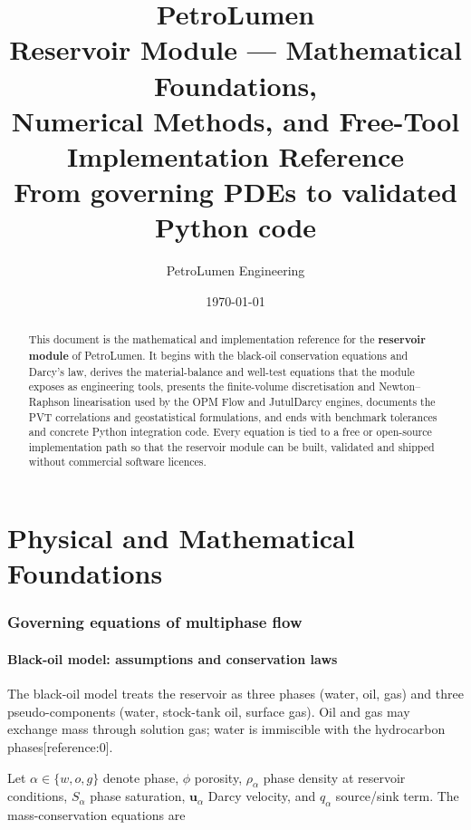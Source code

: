 \documentclass[10pt,a4paper]{article}
\title{
  \vspace{-1.2cm}
  \textbf{PetroLumen}\\[0.2em]
  \large Reservoir Module --- Mathematical Foundations,\\
  Numerical Methods, and Free-Tool Implementation Reference\\[0.4em]
  \normalsize From governing PDEs to validated Python code
}
\author{PetroLumen Engineering}
\date{\today}
\begin{document}
\maketitle
\thispagestyle{empty}

\begin{abstract}
\noindent
This document is the mathematical and implementation reference for the
\textbf{reservoir module} of PetroLumen. It begins with the black-oil
conservation equations and Darcy's law, derives the material-balance and
well-test equations that the module exposes as engineering tools, presents the
finite-volume discretisation and Newton--Raphson linearisation used by the
OPM Flow and JutulDarcy engines, documents the PVT correlations and
geostatistical formulations, and ends with benchmark tolerances and concrete
Python integration code. Every equation is tied to a free or open-source
implementation path so that the reservoir module can be built, validated and
shipped without commercial software licences.
\end{abstract}

\tableofcontents
\clearpage

\part{Physical and Mathematical Foundations}

\section{Governing equations of multiphase flow}

\subsection{Black-oil model: assumptions and conservation laws}

The black-oil model treats the reservoir as three phases (water, oil, gas) and
three pseudo-components (water, stock-tank oil, surface gas). Oil and gas may
exchange mass through solution gas; water is immiscible with the hydrocarbon
phases[reference:0].

Let $\alpha\in\{w,o,g\}$ denote phase, $\phi$ porosity, $\rho_\alpha$ phase
density at reservoir conditions, $S_\alpha$ phase saturation, $\bm{u}_\alpha$
Darcy velocity, and $q_\alpha$ source/sink term. The mass-conservation
equations are
\end{document}
